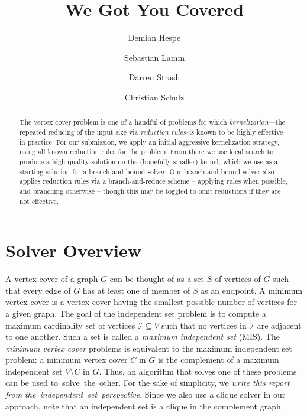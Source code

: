 \documentclass[a4paper,UKenglish]{lipics-v2016}
\newcommand{\mytitle}{We Got You Covered}
\begin{document}
\title{\mytitle}
\author[1]{Demian Hespe}
\author[2]{Sebastian Lamm}
\author[3]{Darren Strash}
\author[4]{Christian Schulz}


\date{}


\Copyright{}
\maketitle
\begin{abstract}
The vertex cover problem is one of a handful of problems for which \emph{kernelization}---the repeated reducing of the input size via \emph{reduction rules}--is known to be highly effective in practice. For our submission, we apply an initial aggressive kernelization strategy, using all known reduction rules for the problem. From there we use local search to produce a high-quality solution on the (hopefully smaller) kernel, which we use as a starting solution for a branch-and-bound solver. Our branch and bound solver also applies reduction rules via a branch-and-reduce scheme -- applying rules when possible, and branching otherwise -- though this may be toggled to omit reductions if they are not effective.\end{abstract}
\section{Solver Overview}

A vertex cover of a graph $G$ can be thought of as a set $S$ of vertices of $G$ such that every edge of $G$ has at least one of member of $S$ as an endpoint.
A minimum vertex cover is a vertex cover having the smallest possible number of vertices for a given graph. 
The goal of the independent set problem is to compute a maximum cardinality set of vertices $\mathcal{I}\subseteq V$ such that no vertices in $\mathcal{I}$ are adjacent to one another. Such a set is called a \emph{maximum independent set} (MIS).
The \emph{minimum vertex cover} problems is 
equivalent to the maximum independent set problem: a
minimum vertex cover $C$ in $G$ is the complement of a maximum independent set $V\setminus C$ in $G$. Thus, an algorithm that solves one of these problems can be used to~solve~the~other.
For the sake of simplicity, we \emph{write this report from the~independent~set~perspective}. 
Since we also use a clique solver in our approach, note that an independent set is a clique in the complement graph.
\end{document}
